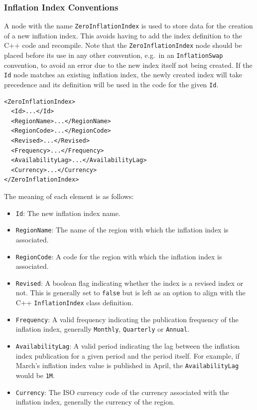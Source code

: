 \subsubsection{Inflation Index Conventions}
A node with the name \lstinline!ZeroInflationIndex! is used to store data for the creation of a new inflation index. This avoids having to add the index definition to the C++ code and recompile. Note that the \lstinline!ZeroInflationIndex! node should be placed before its use in any other convention, e.g.\ in an \lstinline!InflationSwap! convention, to avoid an error due to the new index itself not being created. If the \lstinline!Id! node matches an existing inflation index, the newly created index will take precedence and its definition will be used in the code for the given \lstinline!Id!.

\begin{listing}[H]
\begin{verbatim}
<ZeroInflationIndex>
  <Id>...</Id>
  <RegionName>...</RegionName>
  <RegionCode>...</RegionCode>
  <Revised>...</Revised>
  <Frequency>...</Frequency>
  <AvailabilityLag>...</AvailabilityLag>
  <Currency>...</Currency>
</ZeroInflationIndex>
\end{verbatim}
\caption{\emph{ZeroInflationIndex} node}
\label{lst:zero_inflation_index_conventions}
\end{listing}

The meaning of each element is as follows:
\begin{itemize}
\item \lstinline!Id!: The new inflation index name.
\item \lstinline!RegionName!: The name of the region with which the inflation index is associated.
\item \lstinline!RegionCode!: A code for the region with which the inflation index is associated.
\item \lstinline!Revised!: A boolean flag indicating whether the index is a revised index or not. This is generally set to \lstinline!false! but is left as an option to align with the C++ \lstinline!InflationIndex! class definition.
\item \lstinline!Frequency!: A valid frequency indicating the publication frequency of the inflation index, generally \lstinline!Monthly!, \lstinline!Quarterly! or \lstinline!Annual!.
\item \lstinline!AvailabilityLag!: A valid period indicating the lag between the inflation index publication for a given period and the period itself. For example, if March's inflation index value is published in April, the \lstinline!AvailabilityLag! would be \lstinline!1M!.
\item \lstinline!Currency!: The ISO currency code of the currency associated with the inflation index, generally the currency of the region.
\end{itemize}

